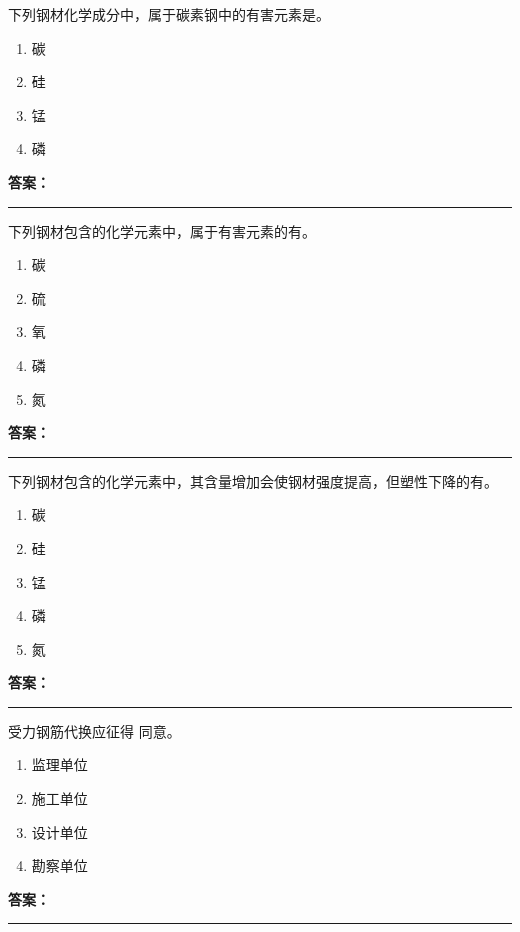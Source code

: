 \documentclass[UTF8,fontset=fandol,11pt]{ctexart}
\newcommand{\answerline}{\textcolor{answerred}{\rule{2.4cm}{0.7pt}}}
\begin{document}
\vspace{0.2em}

\begin{quizbox}[title={第 10 题}]
下列钢材化学成分中，属于碳素钢中的有害元素是。\\
\begin{enumerate}[label=\Alph*.]
\item 碳
\item 硅
\item 锰
\item 磷
\end{enumerate}
\textbf{\textcolor{answerred}{答案：}} \answerline
\end{quizbox}

\vspace{0.2em}

\begin{quizbox}[title={第 11 题}]
下列钢材包含的化学元素中，属于有害元素的有。\\
\begin{enumerate}[label=\Alph*.]
\item 碳
\item 硫
\item 氧
\item 磷
\item 氮
\end{enumerate}
\textbf{\textcolor{answerred}{答案：}} \answerline
\end{quizbox}

\vspace{0.2em}

\begin{quizbox}[title={第 12 题}]
下列钢材包含的化学元素中，其含量增加会使钢材强度提高，但塑性下降的有。\\
\begin{enumerate}[label=\Alph*.]
\item 碳
\item 硅
\item 锰
\item 磷
\item 氮
\end{enumerate}
\textbf{\textcolor{answerred}{答案：}} \answerline
\end{quizbox}

\vspace{0.2em}

\begin{quizbox}[title={第 13 题}]
受力钢筋代换应征得 同意。\\
\begin{enumerate}[label=\Alph*.]
\item 监理单位
\item 施工单位
\item 设计单位
\item 勘察单位
\end{enumerate}
\textbf{\textcolor{answerred}{答案：}} \answerline
\end{quizbox}
\end{document}

